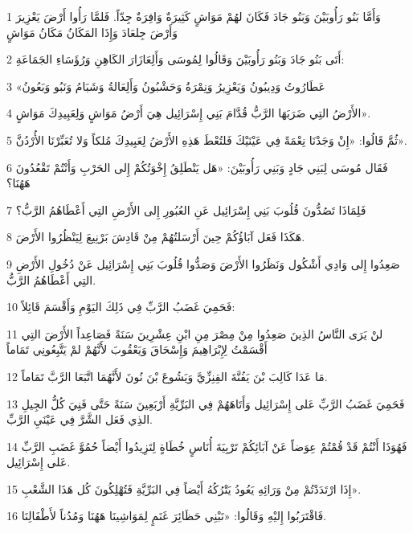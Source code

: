 \par 1 وَأَمَّا بَنُو رَأُوبَيْنَ وَبَنُو جَادَ فَكَانَ لهُمْ مَوَاشٍ كَثِيرَةٌ وَافِرَةٌ جِدّاً. فَلمَّا رَأُوا أَرْضَ يَعْزِيرَ وَأَرْضَ جِلعَادَ وَإِذَا المَكَانُ مَكَانُ مَوَاشٍ
\par 2 أَتَى بَنُو جَادَ وَبَنُو رَأُوبَيْنَ وَقَالُوا لِمُوسَى وَأَلِعَازَارَ الكَاهِنِ وَرُؤَسَاءِ الجَمَاعَةِ:
\par 3 «عَطَارُوتُ وَدِيبُونُ وَيَعْزِيرُ وَنِمْرَةُ وَحَشْبُونُ وَأَلِعَالةُ وَشَبَامُ وَنَبُو وَبَعُونُ
\par 4 الأَرْضُ التِي ضَرَبَهَا الرَّبُّ قُدَّامَ بَنِي إِسْرَائِيل هِيَ أَرْضُ مَوَاشٍ وَلِعَبِيدِكَ مَوَاشٍ».
\par 5 ثُمَّ قَالُوا: «إِنْ وَجَدْنَا نِعْمَةً فِي عَيْنَيْكَ فَلتُعْطَ هَذِهِ الأَرْضُ لِعَبِيدِكَ مُلكاً وَلا تُعَبِّرْنَا الأُرْدُنَّ».
\par 6 فَقَال مُوسَى لِبَنِي جَادٍ وَبَنِي رَأُوبَيْنَ: «هَل يَنْطَلِقُ إِخْوَتُكُمْ إِلى الحَرْبِ وَأَنْتُمْ تَقْعُدُونَ هَهُنَا؟
\par 7 فَلِمَاذَا تَصُدُّونَ قُلُوبَ بَنِي إِسْرَائِيل عَنِ العُبُورِ إِلى الأَرْضِ التِي أَعْطَاهُمُ الرَّبُّ؟
\par 8 هَكَذَا فَعَل آبَاؤُكُمْ حِينَ أَرْسَلتُهُمْ مِنْ قَادِشَ بَرْنِيعَ لِيَنْظُرُوا الأَرْضَ.
\par 9 صَعِدُوا إِلى وَادِي أَشْكُول وَنَظَرُوا الأَرْضَ وَصَدُّوا قُلُوبَ بَنِي إِسْرَائِيل عَنْ دُخُولِ الأَرْضِ التِي أَعْطَاهُمُ الرَّبُّ.
\par 10 فَحَمِيَ غَضَبُ الرَّبِّ فِي ذَلِكَ اليَوْمِ وَأَقْسَمَ قَائِلاً:
\par 11 لنْ يَرَى النَّاسُ الذِينَ صَعِدُوا مِنْ مِصْرَ مِنِ ابْنِ عِشْرِينَ سَنَةً فَصَاعِداً الأَرْضَ التِي أَقْسَمْتُ لِإِبْرَاهِيمَ وَإِسْحَاقَ وَيَعْقُوبَ لأَنَّهُمْ لمْ يَتَّبِعُونِي تَمَاماً
\par 12 مَا عَدَا كَالِبَ بْنَ يَفُنَّةَ القِنِزِّيَّ وَيَشُوعَ بْنَ نُونَ لأَنَّهُمَا اتَّبَعَا الرَّبَّ تَمَاماً.
\par 13 فَحَمِيَ غَضَبُ الرَّبِّ عَلى إِسْرَائِيل وَأَتَاهَهُمْ فِي البَرِّيَّةِ أَرْبَعِينَ سَنَةً حَتَّى فَنِيَ كُلُّ الجِيلِ الذِي فَعَل الشَّرَّ فِي عَيْنَيِ الرَّبِّ.
\par 14 فَهُوَذَا أَنْتُمْ قَدْ قُمْتُمْ عِوَضاً عَنْ آبَائِكُمْ تَرْبِيَةَ أُنَاسٍ خُطَاةٍ لِتَزِيدُوا أَيْضاً حُمُوَّ غَضَبِ الرَّبِّ عَلى إِسْرَائِيل.
\par 15 إِذَا ارْتَدَدْتُمْ مِنْ وَرَائِهِ يَعُودُ يَتْرُكُهُ أَيْضاً فِي البَرِّيَّةِ فَتُهْلِكُونَ كُل هَذَا الشَّعْبِ».
\par 16 فَاقْتَرَبُوا إِليْهِ وَقَالُوا: «نَبْنِي حَظَائِرَ غَنَمٍ لِمَوَاشِينَا هَهُنَا وَمُدُناً لأَطْفَالِنَا.
